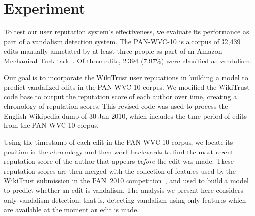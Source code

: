 \section{Experiment}

To test our user reputation system's effectiveness, we
evaluate its performance as part of a vandalism
detection system.
The PAN-WVC-10 is a corpus of 32,439 edits manually
annotated by at least three people as part of an Amazon
Mechanical Turk task~\cite{Potthast2010a}.
Of these edits, 2,394 (7.97\%) were classified as vandalism.

Our goal is to incorporate the WikiTrust user reputations
in building a model to predict vandalized edits in
the PAN-WVC-10 corpus.
We modified the WikiTrust
code base to output the reputation score of each author
over time, creating a chronology of reputation scores.
This revised code was used to process the English Wikipedia
dump of 30-Jan-2010, which includes the time period of
edits from the PAN-WVC-10 corpus.

Using the timestamp of each edit in the PAN-WVC-10 corpus,
we locate its position in the chronology and then work backwards
to find the most recent reputation score of the author
that appears \textit{before} the edit was made.
These reputation scores are then merged with the collection
of features used by the WikiTrust submission in the PAN~2010
competition~\cite{Adler2010b}, and used to build a model to predict
whether an edit is vandalism.
The analysis we present here considers only  vandalism
detection; that is, detecting vandalism using only features which are
available at the moment an edit is made.


